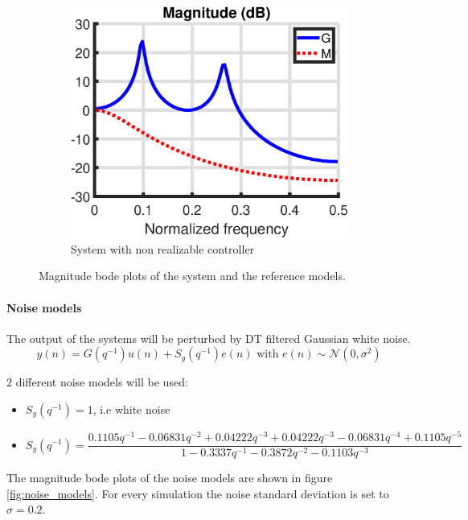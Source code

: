 \begin{figure}[H]
\begin{subfigure}{.33\textwidth}
	\includegraphics[width=\linewidth]{figures/G_and_M_undermodeled.eps}
	\caption{System with non realizable controller}
\end{subfigure}
\caption{Magnitude bode plots of the system and the reference models.}
\label{fig:G_and_M_all}
\end{figure}

\paragraph{Noise models}
The output of the systems will be perturbed by DT filtered Gaussian white noise.
\begin{equation*}
	y(n) = G(q^{-1}) u(n) + S_y(q^{-1}) e(n) \text{ with } e(n) \sim \mathcal{N}(0,\sigma^2)
\end{equation*}

2 different noise models will be used:
\begin{itemize}
\item $S_y(q^{-1}) = 1$, i.e white noise 
\item $S_y(q^{-1}) = \dfrac{0.1105 q^{-1} - 0.06831 q^{-2} + 0.04222 q^{-3} + 0.04222 q^{-3} - 0.06831 q^{-4} + 0.1105 q^{-5}}{1 - 0.3337 q^{-1} - 0.3872 q^{-2} - 0.1103 q^{-3}}$
\end{itemize}
The magnitude bode plots of the noise models are shown in figure \ref{fig:noise_models}. For every simulation the noise standard deviation is set to $\sigma = 0.2$.

